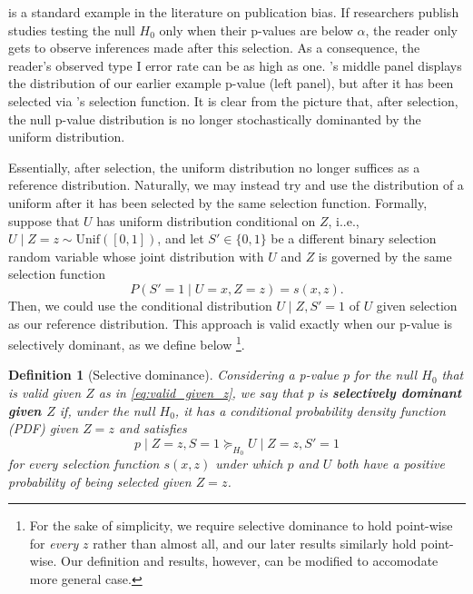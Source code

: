 \documentclass{article}
\newtheorem{definition}{Definition}
\begin{document}
 is a standard example in the literature on publication bias. If researchers publish studies testing the null $H_0$ only when their p-values are below $\alpha$, the reader only gets to observe inferences made after this selection. As a consequence, the reader's observed type I error rate can be as high as one. 's middle panel displays the distribution of our earlier example p-value (left panel), but after it has been selected via 's selection function. It is clear from the picture that, after selection, the null p-value distribution is no longer stochastically dominanted by the uniform distribution. 

Essentially, after selection, the uniform distribution no longer suffices as a reference distribution. Naturally, we may instead try and use the distribution of a uniform after it has been selected by the same selection function. Formally, suppose that $U$ has uniform distribution conditional on $Z$, i..e., $U \mid Z=z \sim \text{Unif}([0, 1])$, and let $S' \in \{0, 1\}$ be a different binary selection random variable whose joint distribution with $U$ and $Z$ is governed by the same selection function 
\begin{equation*}
     P(S' = 1 \mid U = x, Z=z ) = s(x, z).
\end{equation*}
Then, we could use the conditional distribution $U \mid Z,  S' = 1$ of $U$ given selection as our reference distribution. This approach is valid exactly when our p-value is selectively dominant, as we define below \footnote{For the sake of simplicity, we require selective dominance to hold point-wise for \emph{every} $z$ rather than almost all, and our later results similarly hold point-wise. Our definition and results, however, can be modified to accomodate more general case.}. 

\begin{definition}[Selective dominance]
    \label{def:selective_dominance}
    Considering a p-value $p$ for the null $H_0$ that is valid given $Z$ as in \eqref{eq:valid_given_z}, we say that $p$ is \textbf{selectively dominant given $Z$} if, under the null $H_0$, it has a conditional probability density function (PDF) given $Z=z$ and satisfies
    \begin{equation}
    \label{eq:selective_dominance}
    p \mid Z=z, S = 1 \succeq_{H_0} U \mid Z=z, S' = 1
    \end{equation}
    for every selection function $s(x, z)$ under which $p$ and $U$ both have a positive probability of being selected given $Z=z$. 
\end{definition}
\end{document}
